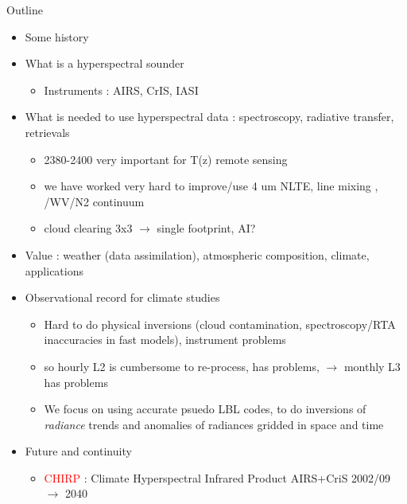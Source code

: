 \documentclass[10pt,t]{beamer}
\begin{document}
\begin{frame}[shrink=2]{Outline}
\begin{itemize}
  \item Some history
  \item What is a hyperspectral sounder    
    \begin{itemize}
      \item Instruments : AIRS, CrIS, IASI
    \end{itemize}
  \item What is needed to use hyperspectral data : spectroscopy, radiative transfer, retrievals
    \begin{itemize}
      \item  2380-2400 \wn very important for T(z) remote sensing
      \item we have worked very hard to improve/use 4 um NLTE, \cd line mixing , \cd/WV/N2 continuum
      \item cloud clearing 3x3 $\rightarrow$ single footprint, AI?
    \end{itemize}
  \item Value : weather (data assimilation), atmospheric composition, climate, applications
  \item Observational record for climate studies
    \begin{itemize}
      \item Hard to do physical inversions (cloud contamination, spectroscopy/RTA inaccuracies in fast models), instrument problems
      \item so hourly L2 is cumbersome to re-process, has problems, $\rightarrow$ monthly L3 has problems
      \item We focus on using accurate psuedo LBL codes, to do inversions of \emph{radiance} trends and anomalies of radiances gridded in space and time
    \end{itemize}
  \item Future and continuity
    \begin{itemize}
      \item \textcolor{red}{CHIRP} : Climate Hyperspectral Infrared Product AIRS+CriS 2002/09 $\rightarrow$ 2040
    \end{itemize}
\end{itemize}
\end{frame}

\end{document}
